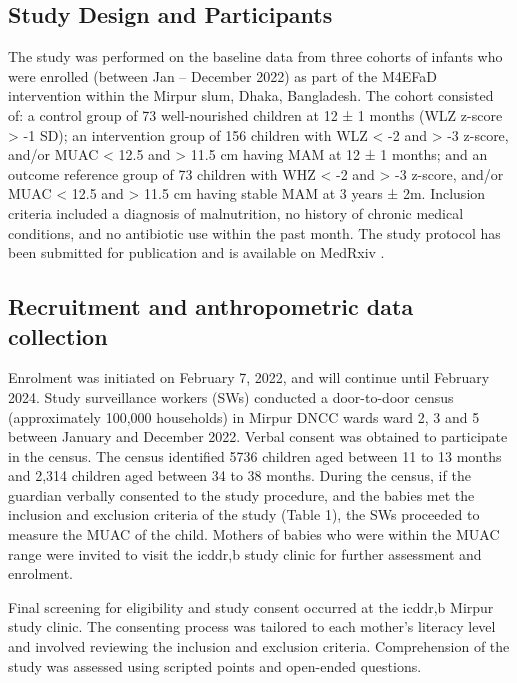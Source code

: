 \documentclass{article}
\begin{document}
\subsection*{Study Design and Participants}
The study was performed on the baseline data from three cohorts of infants who were enrolled (between Jan – December 2022) as part of the M4EFaD intervention within the Mirpur slum, Dhaka, Bangladesh.
The cohort consisted of: a control group of 73 well-nourished children at 12 ± 1 months (WLZ z-score \textgreater{} -1 SD); an intervention group of 156 children with WLZ \textless{} -2 and \textgreater{} -3 z-score, and/or MUAC \textless{} 12.5 and \textgreater{} 11.5 cm having \gls{MAM} at 12 ± 1 months; and an outcome reference group of 73 children with WHZ \textless{} -2 and \textgreater{} -3 z-score, and/or \gls{MUAC} \textless{} 12.5 and \textgreater{} 11.5 cm having stable \gls{MAM} at 3 years ± 2m.
Inclusion criteria included a diagnosis of malnutrition, no history of chronic medical conditions, and no antibiotic use within the past month.
The study protocol has been submitted for publication and is available on MedRxiv \cite{shama2023multidimensional}.

\subsection*{Recruitment and anthropometric data collection}
Enrolment was initiated on February 7, 2022, and will continue until February 2024.
Study surveillance workers (SWs) conducted a door-to-door census (approximately 100,000 households) in Mirpur DNCC wards ward 2, 3 and 5 between January and December 2022.
Verbal consent was obtained to participate in the census.
The census identified 5736 children aged between 11 to 13 months and 2,314 children aged between 34 to 38 months.
During the census, if the guardian verbally consented to the study procedure, and the babies met the inclusion and exclusion criteria of the study (Table 1), the SWs proceeded to measure the \gls{MUAC} of the child.
Mothers of babies who were within the \gls{MUAC} range were invited to visit the icddr,b study clinic for further assessment and enrolment.

Final screening for eligibility and study consent occurred at the icddr,b Mirpur study clinic.
The consenting process was tailored to each mother's literacy level and involved reviewing the inclusion and exclusion criteria.
Comprehension of the study was assessed using scripted points and open-ended questions.
\end{document}
